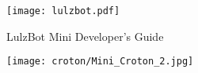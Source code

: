 %
%
%
%
%

\date {}
\thispagestyle{empty}
\begin{center}
\par
\texttt{[image: lulzbot.pdf]}

{\fontsize{25pt}{5cm}\selectfont \textcolor{ao-purple}{LulzBot Mini Developer's Guide}}

\texttt{[image: croton/Mini\_Croton\_2.jpg]}

\end{center}
